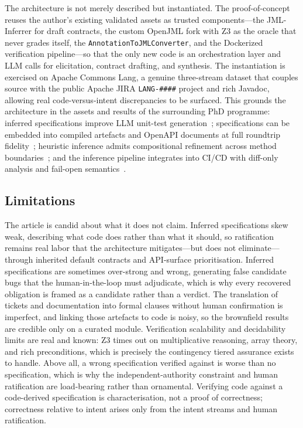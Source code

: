 The architecture is not merely described but instantiated. The proof-of-concept reuses the author's existing validated assets as trusted components---the JML-Inferrer for draft contracts, the custom OpenJML fork with Z3 as the oracle that never grades itself, the \texttt{AnnotationToJMLConverter}, and the Dockerized verification pipeline---so that the only new code is an orchestration layer and LLM calls for elicitation, contract drafting, and synthesis. The instantiation is exercised on Apache Commons Lang, a genuine three-stream dataset that couples source with the public Apache JIRA \texttt{LANG-\#\#\#\#} project and rich Javadoc, allowing real code-versus-intent discrepancies to be surfaced. This grounds the architecture in the assets and results of the surrounding PhD programme: inferred specifications improve LLM unit-test generation~\cite{edmonds_article1}; specifications can be embedded into compiled artefacts and OpenAPI documents at full roundtrip fidelity~\cite{edmonds_article2}; heuristic inference admits compositional refinement across method boundaries~\cite{edmonds_article3}; and the inference pipeline integrates into CI/CD with diff-only analysis and fail-open semantics~\cite{edmonds_article4}.

\subsection{Limitations}
\label{subsec:conclusion-limitations}

The article is candid about what it does not claim. Inferred specifications skew weak, describing what code does rather than what it should, so ratification remains real labor that the architecture mitigates---but does not eliminate---through inherited default contracts and API-surface prioritisation. Inferred specifications are sometimes over-strong and wrong, generating false candidate bugs that the human-in-the-loop must adjudicate, which is why every recovered obligation is framed as a candidate rather than a verdict. The translation of tickets and documentation into formal clauses without human confirmation is imperfect, and linking those artefacts to code is noisy, so the brownfield results are credible only on a curated module. Verification scalability and decidability limits are real and known: Z3 times out on multiplicative reasoning, array theory, and rich preconditions, which is precisely the contingency tiered assurance exists to handle. Above all, a wrong specification verified against is worse than no specification, which is why the independent-authority constraint and human ratification are load-bearing rather than ornamental. Verifying code against a code-derived specification is characterisation, not a proof of correctness; correctness relative to intent arises only from the intent streams and human ratification.

